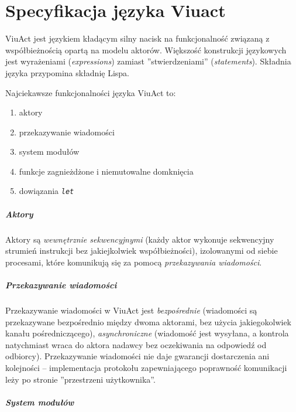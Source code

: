 \chapter{Specyfikacja języka Viuact}
\label{specyfikacja_jezyka_viuact}

ViuAct jest językiem kładącym silny nacisk na funkcjonalność związaną z współbieżnością opartą na modelu
aktorów. Większość konstrukcji językowych jest wyrażeniami (\emph{expressions}) zamiast ''stwierdzeniami''
(\emph{statements}). Składnia języka przypomina składnię Lispa.

Najciekawsze funkcjonalności języka ViuAct to:

\begin{enumerate}
    \item aktory
    \item przekazywanie wiadomości
    \item system modułów
    \item funkcje zagnieżdżone i niemutowalne domknięcia
    \item dowiązania \emph{\texttt{let}}
\end{enumerate}

\paragraph*{Aktory}

Aktory są \emph{wewnętrznie sekwencyjnymi} (każdy aktor wykonuje sekwencyjny strumień instrukcji bez
jakiejkolwiek współbieżności), izolowanymi od siebie procesami, które komunikują się za pomocą
\emph{przekazywania wiadomości}.

\paragraph*{Przekazywanie wiadomości}

Przekazywanie wiadomości w ViuAct jest \emph{bezpośrednie} (wiadomości są przekazywane bezpośrednio między
dwoma aktorami, bez użycia jakiegokolwiek kanału pośredniczącego), \emph{asynchroniczne} (wiadomość jest
wysyłana, a kontrola natychmiast wraca do aktora nadawcy bez oczekiwania na odpowiedź od odbiorcy).
Przekazywanie wiadomości nie daje gwarancji dostarczenia ani kolejności -- implementacja protokołu
zapewniającego poprawność komunikacji leży po stronie ''przestrzeni użytkownika''.

\paragraph*{System modułów}


